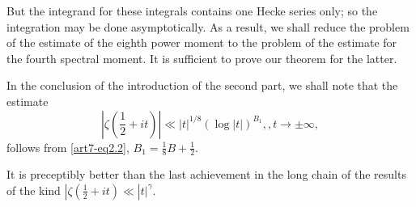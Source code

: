 But the integrand for these integrals contains one Hecke series only; so the integration may be done asymptotically. As a result, we shall reduce the problem of the estimate of the eighth power moment to the problem of the estimate for the fourth spectral moment. It is sufficient to prove  our theorem for the latter. 

In the conclusion of the introduction of the second part, we shall note that the estimate 
$$
|\zeta(\frac{1}{2} + it)| \ll  |t|^{1/8} (\log |t|)^{B_1} ,, t \to \pm \infty, 
$$
follows from \eqref{art7-eq2.2}, $B_1 = \frac{1}{8} B + \frac{1}{2}$.

It is preceptibly better than the last achievement in the long chain of the results of the kind $|\zeta(\frac{1}{2} + it) \ll |t|^\gamma$.









